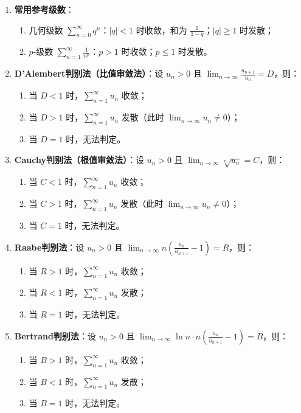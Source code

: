\documentclass[UTF8]{ctexart}
\theoremstyle{remark}
\begin{document}
\begin{enumerate}
	\item \textbf{常用参考级数}：
	\begin{enumerate}
		\item 几何级数 \(\sum_{n=0}^{\infty} q^n\)：\(|q| < 1\) 时收敛，和为 \(\frac{1}{1-q}\)；\(|q| \geq 1\) 时发散；
		\item \(p\)-级数 \(\sum_{n=1}^{\infty} \frac{1}{n^p}\)：\(p > 1\) 时收敛；\(p \leq 1\) 时发散。
	\end{enumerate}
	
	\item \textbf{D'Alembert判别法（比值审敛法）}：设 \(u_n > 0\) 且 \(\lim_{n \to \infty} \frac{u_{n+1}}{u_n} = D\)，则：
	\begin{enumerate}
		\item 当 \(D < 1\) 时，\(\sum_{n=1}^{\infty} u_n\) 收敛；
		\item 当 \(D > 1\) 时，\(\sum_{n=1}^{\infty} u_n\) 发散（此时 \(\lim_{n \to \infty} u_n \neq 0\)）；
		\item 当 \(D = 1\) 时，无法判定。
	\end{enumerate}
	
	\item \textbf{Cauchy判别法（根值审敛法）}：设 \(u_n > 0\) 且 \(\lim_{n \to \infty} \sqrt[n]{u_n} = C\)，则：
	\begin{enumerate}
		\item 当 \(C < 1\) 时，\(\sum_{n=1}^{\infty} u_n\) 收敛；
		\item 当 \(C > 1\) 时，\(\sum_{n=1}^{\infty} u_n\) 发散（此时 \(\lim_{n \to \infty} u_n \neq 0\)）；
		\item 当 \(C = 1\) 时，无法判定。
	\end{enumerate}
	
	\item \textbf{Raabe判别法}：设 \(u_n > 0\) 且 \(\lim_{n \to \infty} n\left(\frac{u_n}{u_{n+1}} - 1\right) = R\)，则：
	\begin{enumerate}
		\item 当 \(R > 1\) 时，\(\sum_{n=1}^{\infty} u_n\) 收敛；
		\item 当 \(R < 1\) 时，\(\sum_{n=1}^{\infty} u_n\) 发散；
		\item 当 \(R = 1\) 时，无法判定。
	\end{enumerate}
	
	\item \textbf{Bertrand判别法}：设 \(u_n > 0\) 且 \(\lim_{n \to \infty} \ln n \cdot n\left(\frac{u_n}{u_{n+1}} - 1\right) = B\)，则：
	\begin{enumerate}
		\item 当 \(B > 1\) 时，\(\sum_{n=1}^{\infty} u_n\) 收敛；
		\item 当 \(B < 1\) 时，\(\sum_{n=1}^{\infty} u_n\) 发散；
		\item 当 \(B = 1\) 时，无法判定。
	\end{enumerate}
	

\end{enumerate}
\end{document}
